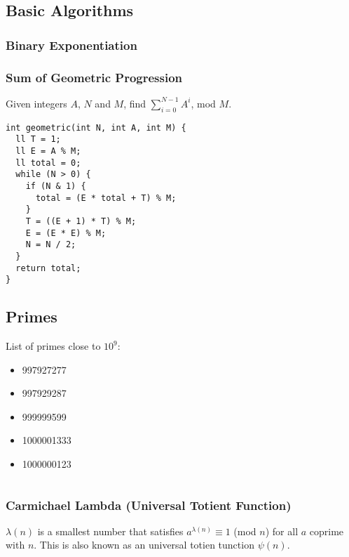 \subsection{Basic Algorithms}

\subsubsection{Binary Exponentiation}

\subsubsection{Sum of Geometric Progression}

Given integers $A$, $N$ and $M$, find $\displaystyle \sum_{i=0}^{N-1} A^i$, mod $M$.

\begin{lstlisting}
int geometric(int N, int A, int M) {
  ll T = 1;
  ll E = A % M;
  ll total = 0;
  while (N > 0) {
    if (N & 1) {
      total = (E * total + T) % M;
    }
    T = ((E + 1) * T) % M;
    E = (E * E) % M;
    N = N / 2;
  }
  return total;
}
\end{lstlisting}

\subsection{Primes}

List of primes close to $10^9$:
\begin{itemize}
  \item 997927277
  \item 997929287
  \item 999999599
  \item 1000001333
  \item 1000000123
\end{itemize}

\hrulefill \vspace{-\baselineskip}
\begin{multicols}{2}
\inputminted[autogobble,fontsize=\tiny]{C++}{Maths/primes.cpp}
\end{multicols}
\vspace{-\baselineskip}
\noindent \hrulefill

\subsubsection{Carmichael Lambda (Universal Totient Function)}

$\lambda(n)$ is a smallest number that satisfies $a^{\lambda(n)} \equiv 1$ (mod $n$)
for all $a$ coprime with $n$. This is also known as an universal totien tunction $\psi(n)$.


